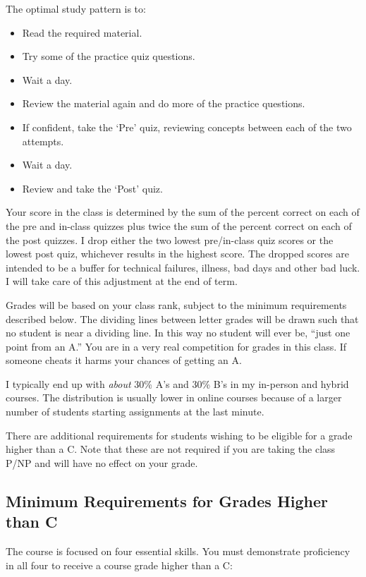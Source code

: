 \documentclass[letterpaper,10pt]{article}
\begin{document}
The optimal study pattern is to:
\begin{itemize}
\item Read the required material.
\item Try some of the practice quiz questions.
\item Wait a day.
\item Review the material again and do more of the practice questions.
\item If confident, take the `Pre' quiz, reviewing concepts between each of the two attempts.
\item Wait a day.
\item Review and take the `Post' quiz.
\end{itemize}

Your score in the class is determined by the sum of the percent correct on each of the pre and in-class quizzes plus twice the sum of the percent correct on each of the post quizzes. I drop either the two
lowest pre/in-class quiz scores or the lowest post quiz, whichever results in the highest score. 
The dropped scores are intended to be a buffer for technical
failures, illness, bad days and other bad luck.  I will take care of
this adjustment at the end of term.  


Grades will be based on your class rank, subject to the minimum
requirements described below. The dividing lines between letter grades will be
drawn such that no student is near a dividing line. In this way no
student will ever be, ``just one point from an A.'' You are in a very
real competition for grades in this class. If someone cheats it harms
your chances of getting an A. 

I typically end up with \emph{about} 30\%
A's and 30\% B's in my in-person and hybrid courses.  The distribution is usually lower in online courses because of a larger number of students starting assignments at the last minute.   


There are additional requirements for students wishing to be eligible for a grade higher than a C.  Note that these are not required if you are taking the class P/NP and will have no effect on your grade.


\subsection{Minimum Requirements for Grades Higher than C}

The course is focused on four essential skills. You must
demonstrate proficiency in all four to receive a course grade higher than a C:
\end{document}
